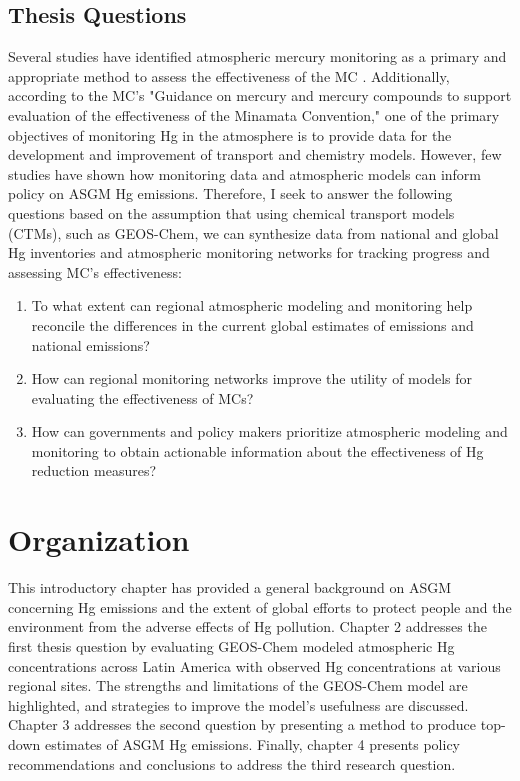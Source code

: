 \begin{flushleft}

 \section{Thesis Questions}
 Several studies have identified atmospheric mercury monitoring as a primary and appropriate method to assess the effectiveness of the MC \cite{sprovieri_atmospheric_2016,evers_evaluating_2016,gustin_measuring_2015,united_nations_environment_programme_technical_2019}. Additionally, according to the MC's "Guidance on mercury and mercury compounds to support evaluation of the effectiveness of the Minamata Convention," one of the primary objectives of monitoring Hg in the atmosphere is to provide data for the development and improvement of transport and chemistry models\cite{unep_guidance_2021}. However, few studies have shown how monitoring data and atmospheric models can inform policy on ASGM Hg emissions. Therefore, I seek to answer the following questions based on the assumption that using chemical transport models (CTMs), such as GEOS-Chem, we can synthesize data from national and global Hg inventories and atmospheric monitoring networks for tracking progress and assessing MC's effectiveness:
\begin{enumerate}
  \item To what extent can regional atmospheric modeling and monitoring help reconcile the differences in the current global estimates of emissions and national emissions?
  \item How can regional monitoring networks improve the utility of models for evaluating the effectiveness of MCs?
  \item How can governments and policy makers prioritize atmospheric modeling and monitoring to obtain actionable information about the effectiveness of Hg reduction measures?
\end{enumerate}
\end{flushleft}

 
\section{Organization}
 
\begin{flushleft}
  This introductory chapter has provided a general background on ASGM concerning Hg emissions and the extent of global efforts to protect people and the environment from the adverse effects of Hg pollution. Chapter 2 addresses the first thesis question by evaluating GEOS-Chem modeled atmospheric Hg concentrations across Latin America with observed Hg concentrations at various regional sites. The strengths and limitations of the GEOS-Chem model are highlighted, and strategies to improve the model's usefulness are discussed. Chapter 3 addresses the second question by presenting a method to produce top-down estimates of ASGM Hg emissions. Finally, chapter 4 presents policy recommendations and conclusions to address the third research question.  
\end{flushleft}



